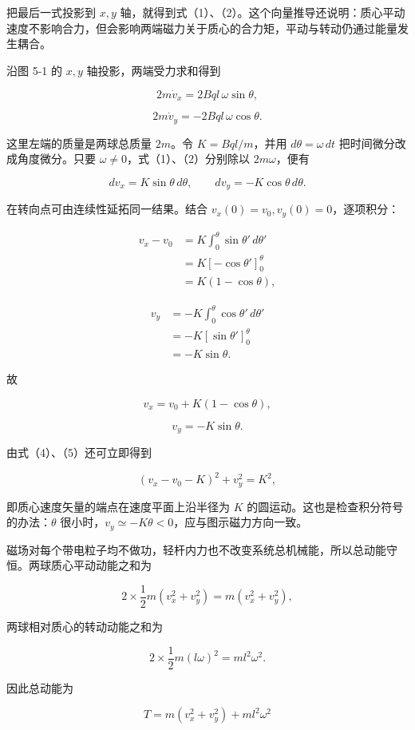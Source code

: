 \documentclass[12pt,a4paper,UTF8]{ctexart}
\begin{document}
把最后一式投影到 \(x,y\)
轴，就得到式（1）、（2）。这个向量推导还说明：质心平动速度不影响合力，但会影响两端磁力关于质心的合力矩，平动与转动仍通过能量发生耦合。

沿图 5-1 的 \(x,y\) 轴投影，两端受力求和得到

\[
2m\dot v_x=2Bql\,\omega\sin\theta,
\tag{1}
\]

\[
2m\dot v_y=-2Bql\,\omega\cos\theta.
\tag{2}
\]

这里左端的质量是两球总质量 \(2m\)。令 \(K=Bql/m\)，并用
\(d\theta=\omega\,dt\) 把时间微分改成角度微分。只要
\(\omega\ne0\)，式（1）、（2）分别除以 \(2m\omega\)，便有

\[
dv_x=K\sin\theta\,d\theta,
\qquad
dv_y=-K\cos\theta\,d\theta.
\tag{3}
\]

在转向点可由连续性延拓同一结果。结合 \(v_x(0)=v_0,v_y(0)=0\)，逐项积分：

\[
\begin{aligned}
v_x-v_0
&=K\int_0^\theta\sin\theta'\,d\theta'\\
&=K[-\cos\theta']_0^\theta\\
&=K(1-\cos\theta),
\end{aligned}
\]

\[
\begin{aligned}
v_y
&=-K\int_0^\theta\cos\theta'\,d\theta'\\
&=-K[\sin\theta']_0^\theta\\
&=-K\sin\theta.
\end{aligned}
\]

故

\[
\boxed{v_x=v_0+K(1-\cos\theta)},
\tag{4}
\]

\[
\boxed{v_y=-K\sin\theta}.
\tag{5}
\]

由式（4）、（5）还可立即得到

\[
(v_x-v_0-K)^2+v_y^2=K^2,
\]

即质心速度矢量的端点在速度平面上沿半径为 \(K\)
的圆运动。这也是检查积分符号的办法：\(\theta\)
很小时，\(v_y\simeq-K\theta<0\)，应与图示磁力方向一致。

磁场对每个带电粒子均不做功，轻杆内力也不改变系统总机械能，所以总动能守恒。两球质心平动动能之和为

\[
2\times\frac12m(v_x^2+v_y^2)=m(v_x^2+v_y^2),
\]

两球相对质心的转动动能之和为

\[
2\times\frac12m(l\omega)^2=ml^2\omega^2.
\]

因此总动能为

\[
T=m(v_x^2+v_y^2)+ml^2\omega^2
\tag{6}
\]
\end{document}
